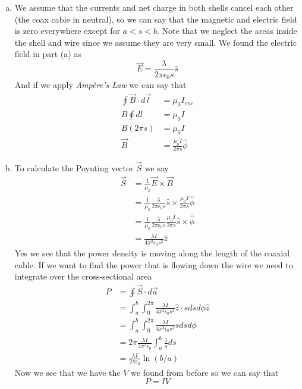 \documentclass[11pt]{article}
\numberwithin{equation}{section}
\begin{document}
\begin{enumerate}[(a)]
\item
We assume that the currents and net charge in both shells cancel each other (the coax cable in neutral), so we can say that the magnetic and electric field is zero everywhere except for $a<s<b$. Note that we neglect the areas inside the shell and wire since we assume they are very small. We found the electric field in part (a) as
$$\vec{E} = \frac{\lambda}{2\pi\epsilon_0 s}\hat{s}$$
And if we apply \emph{Amp\`{e}re's Law} we can say that
\begin{align*}
\oint\vec{B}\cdot d\vec{l} &= \mu_0 I_{enc}\\
B\oint dl &= \mu_0 I\\
B(2\pi s) &= \mu_0 I\\
\vec{B} &= \frac{\mu_0 I}{2\pi s}\hat{\phi}
\end{align*}

\item
To calculate the Poynting vector $\vec{S}$ we say
\begin{align*}
\vec{S} &= \frac{1}{\mu_0}\vec{E}\times\vec{B}\\
&= \frac{1}{\mu_0}\frac{\lambda}{2\pi\epsilon_0 s}\hat{s}\times\frac{\mu_0 I}{2\pi s}\hat{\phi}\\
&= \frac{1}{\mu_0}\frac{\lambda}{2\pi\epsilon_0 s}\frac{\mu_0 I}{2\pi s}\hat{s}\times\hat{\phi}\\
&= \frac{\lambda I}{4\pi^2\epsilon_0 s^2}\hat{z}
\end{align*}
Yes we see that the power density is moving along the length of the coaxial cable. If we want to find the power that is flowing down the wire we need to integrate over the cross-sectional area
\begin{align*}
P &= \oint\vec{S}\cdot d\vec{a}\\
&= \int_a^b\int_0^{2\pi}\frac{\lambda I}{4\pi^2\epsilon_0 s^2}\hat{z}\cdot sdsd\phi\hat{z}\\
&= \int_a^b\int_0^{2\pi}\frac{\lambda I}{4\pi^2\epsilon_0 s^2}sdsd\phi\\
&= 2\pi\frac{\lambda I}{4\pi^2\epsilon_0}\int_a^b\frac{1}{s}ds\\
&= \frac{\lambda I}{2\pi\epsilon_0}\ln(b/a)
\end{align*}
Now we see that we have the $V$ we found from before so we can say that
$$P = IV$$
\end{enumerate}
\end{document}
